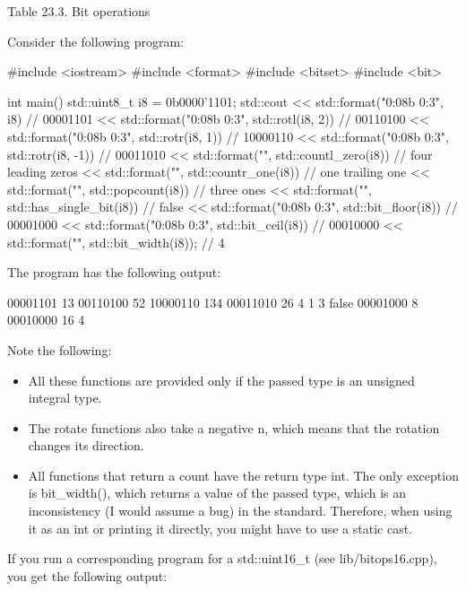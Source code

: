 \begin{center}
Table 23.3. Bit operations
\end{center}

Consider the following program:


\begin{cpp}
#include <iostream>
#include <format>
#include <bitset>
#include <bit>

int main()
{
	std::uint8_t i8 = 0b0000’1101;
	std::cout
		<< std::format("{0:08b} {0:3}\n", i8) // 00001101
		<< std::format("{0:08b} {0:3}\n", std::rotl(i8, 2)) // 00110100
		<< std::format("{0:08b} {0:3}\n", std::rotr(i8, 1)) // 10000110
		<< std::format("{0:08b} {0:3}\n", std::rotr(i8, -1)) // 00011010
		<< std::format("{}\n", std::countl_zero(i8)) // four leading zeros
		<< std::format("{}\n", std::countr_one(i8)) // one trailing one
		<< std::format("{}\n", std::popcount(i8)) // three ones
		<< std::format("{}\n", std::has_single_bit(i8)) // false
		<< std::format("{0:08b} {0:3}\n", std::bit_floor(i8)) // 00001000
		<< std::format("{0:08b} {0:3}\n", std::bit_ceil(i8)) // 00010000
		<< std::format("{}\n", std::bit_width(i8)); // 4
}
\end{cpp}

The program has the following output:

\begin{shell}
00001101  13
00110100  52
10000110 134
00011010  26
4 
1 
3
false
00001000  8
00010000 16
4
\end{shell}

Note the following:

\begin{itemize}
\item 
All these functions are provided only if the passed type is an unsigned integral type.

\item 
The rotate functions also take a negative n, which means that the rotation changes its direction.

\item 
All functions that return a count have the return type int. The only exception is bit\_width(), which returns a value of the passed type, which is an inconsistency (I would assume a bug) in the standard. Therefore, when using it as an int or printing it directly, you might have to use a static cast.
\end{itemize}

If you run a corresponding program for a std::uint16\_t (see lib/bitops16.cpp), you get the following output:

